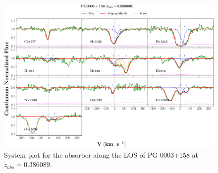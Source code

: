   
  \newpage
  
  
  \begin{landscape}
  
      \begin{figure}
      \centering
      \vspace{-20mm}
      \hspace*{-35mm}
      \includegraphics[width=1.25\linewidth]{System-Plots/PG0003+158_z=0.386089_sys_plot.png}
      \caption{System plot for the absorber along the LOS of PG 0003+158 at $z_{abs} = 0.386089$. }
      \end{figure}
      
  \end{landscape}
  
